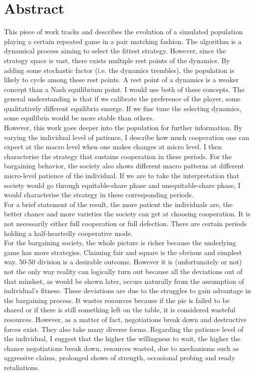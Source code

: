 \documentclass[12.5pt]{report}
\begin{document}
\chapter*{Abstract}

This piece of work tracks and describes the evolution of a simulated population playing a certain repeated game in a pair matching fashion. The algorithm is a dynamical process aiming to select the fittest strategy. However, since the strategy space is vast, there exists multiple rest points of the dynamics. By adding some stochastic factor (i.e. the dynamics trembles), the population is likely to cycle among these rest points. A rest point of a dynamics is a weaker concept than a Nash equilibrium point. I would use both of these concepts. The general understanding is that if we calibrate the preference of the player, some qualitatively different equilibria emerge. If we fine tune the selecting dynamics, some equilibria would be more stable than others.\\

However, this work goes deeper into the population for further information. By varying the individual level of patience, I describe how much cooperation one can expect at the macro level when one makes changes at micro level. I then characterise the strategy that sustains cooperation in these periods. For the bargaining behavior, the society also shows different macro patterns at different micro-level patience of the individual. If we are to take the interpretation that society would go through equitable-share phase and unequitable-share phase, I would characterise the strategy in these corresponding periods.\\

For a brief statement of the result, the more patient the individuals are, the better chance and more varieties the society can get at choosing cooperation. It is not necessarily either full cooperation or full defection. There are certain periods holding a half-heartedly cooperative mode.\\

For the bargaining society, the whole picture is richer because the underlying game has more strategies. Claiming fair and square is the obvious and simplest way. 50-50 division is a desirable outcome. However it is (unfortunately or not) not the only way reality can logically turn out because all the deviations out of that mindset, as would be shown later, occurs naturally from the assumption of individual's fitness. These deviations are due to the struggles to gain advantage in the bargaining process. It wastes resources because if the pie is failed to be shared or if there is still something left on the table, it is considered wasteful resources. However, as a matter of fact, negotiations break down and destructive forces exist. They also take many diverse forms. Regarding the patience level of the individual, I suggest that the higher the willingness to wait, the higher the chance negotiations break down, resources wasted, due to mechanisms such as aggressive claims, prolonged shows of strength, occasional probing and ready retaliations. 
\end{document}

